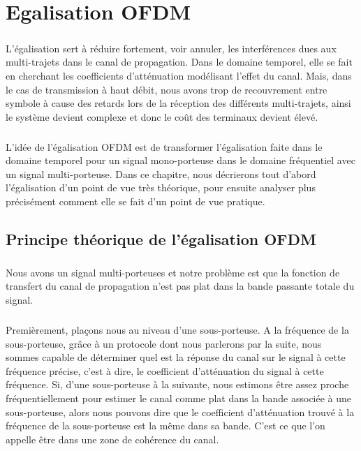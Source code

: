 
\chapter{Egalisation OFDM}
\paragraph{}

L’égalisation sert à réduire fortement, voir annuler, les interférences dues aux
multi-trajets dans le canal de propagation. Dans le domaine temporel, elle se
fait en cherchant les coefficients d’atténuation modélisant l’effet du canal.
Mais, dans le cas de transmission à haut débit, nous avons trop de recouvrement
entre symbole à cause des retards lors de la réception des différents
multi-trajets, ainsi le système devient complexe et donc le coût des terminaux
devient élevé.
\paragraph{}
L’idée de l’égalisation OFDM est de transformer l’égalisation faite dans le
domaine temporel pour un signal mono-porteuse dans le domaine fréquentiel avec un signal multi-porteuse. Dans ce chapitre, nous décrierons tout d'abord l'égalisation d'un point de vue très théorique, pour ensuite analyser plus précisément comment elle se fait d'un point de vue pratique. 


\section{Principe théorique de l'égalisation OFDM}
\paragraph{}
Nous avons un signal multi-porteuses et notre problème est que la fonction de transfert du canal de propagation n'est pas plat dans la bande passante totale du signal. 
\paragraph{}
Premièrement, plaçons nous au niveau d'une sous-porteuse. A la fréquence de la sous-porteuse, grâce à un protocole dont nous parlerons par la suite, nous sommes capable de déterminer quel est la réponse du canal sur le signal à cette fréquence précise, c'est à dire, le coefficient d'atténuation du signal à cette fréquence. Si, d'une sous-porteuse à la suivante, nous estimons être assez proche fréquentiellement pour estimer le canal comme plat dans la bande associée à une sous-porteuse, alors nous pouvons dire que le coefficient d'atténuation trouvé à la fréquence de la sous-porteuse est la même dans sa bande. C'est ce que l'on appelle être dans une zone de cohérence du canal.
